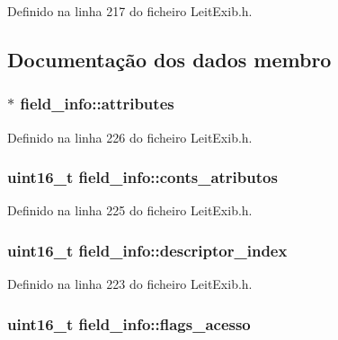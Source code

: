 Definido na linha 217 do ficheiro Leit\-Exib.\-h.



\subsection{Documentação dos dados membro}
\hypertarget{structfield__info_afdda114944ae5eaae78c237f99257108}{
\subsubsection[{attributes}]{$\ast$ field\-\_\-info\-::attributes}}\label{structfield__info_afdda114944ae5eaae78c237f99257108}


Definido na linha 226 do ficheiro Leit\-Exib.\-h.

\hypertarget{structfield__info_a8da20a3727e18a7f1a7e59cedacaa80c}{
\subsubsection[{conts\-\_\-atributos}]{\setlength{\rightskip}{0pt plus 5cm}uint16\-\_\-t field\-\_\-info\-::conts\-\_\-atributos}}\label{structfield__info_a8da20a3727e18a7f1a7e59cedacaa80c}


Definido na linha 225 do ficheiro Leit\-Exib.\-h.

\hypertarget{structfield__info_a56345eae0135047540b60ca34c91eb46}{
\subsubsection[{descriptor\-\_\-index}]{\setlength{\rightskip}{0pt plus 5cm}uint16\-\_\-t field\-\_\-info\-::descriptor\-\_\-index}}\label{structfield__info_a56345eae0135047540b60ca34c91eb46}


Definido na linha 223 do ficheiro Leit\-Exib.\-h.

\hypertarget{structfield__info_af4858fc71c02c24357fb6be046516331}{
\subsubsection[{flags\-\_\-acesso}]{\setlength{\rightskip}{0pt plus 5cm}uint16\-\_\-t field\-\_\-info\-::flags\-\_\-acesso}}\label{structfield__info_af4858fc71c02c24357fb6be046516331}


